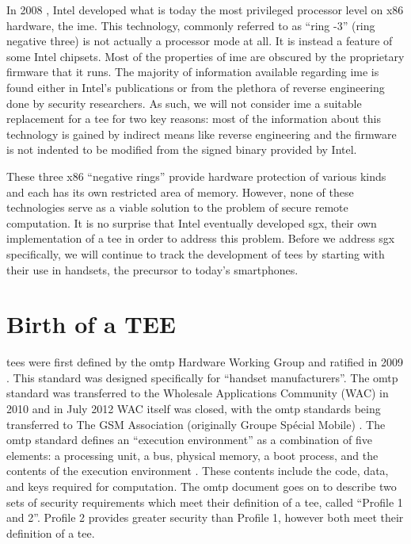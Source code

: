 In 2008 \cite{eldar2008configuring} , Intel developed what is today the most privileged processor level on x86 hardware, the \gls{ime}. This technology, commonly referred to as ``ring -3'' (ring negative three) is not actually a processor mode at all. It is instead a feature of some Intel chipsets. Most of the properties of \gls{ime} are obscured by the proprietary firmware that it runs. The majority of information available regarding \gls{ime} is found either in Intel's publications or from the plethora of reverse engineering done by security researchers. As such, we will not consider \gls{ime} a suitable replacement for a \gls{tee} for two key reasons: most of the information about this technology is gained by indirect means like reverse engineering and the firmware is not indented to be modified from the signed binary provided by Intel. 

These three x86 ``negative rings'' provide hardware protection of various kinds and each has its own restricted area of memory. However, none of these technologies serve as a viable solution to the problem of secure remote computation. It is no surprise that Intel eventually developed \gls{sgx}, their own implementation of a \gls{tee} in order to address this problem. Before we address \gls{sgx} specifically, we will continue to track the development of \glspl{tee} by starting with their use in handsets, the precursor to today's smartphones.

\section{Birth of a TEE}

\glspl{tee} were first defined by the \gls{omtp} Hardware Working Group and ratified in 2009 \cite{Confidential2009}. This standard was designed specifically for ``handset manufacturers''. The \gls{omtp} standard was transferred to the Wholesale Applications Community (WAC) in 2010 and in July 2012 WAC itself was closed, with the \gls{omtp} standards being transferred to The GSM Association (originally Groupe Sp\'ecial Mobile) \cite{WAC}. The \gls{omtp} standard defines an ``execution environment'' as a combination of five elements: a processing unit, a bus, physical memory, a boot process, and the contents of the execution environment \cite{Confidential2009}. These contents include the code, data, and keys required for computation. The \gls{omtp} document goes on to describe two sets of security requirements which meet their definition of a \gls{tee}, called ``Profile 1 and 2''. Profile 2 provides greater security than Profile 1, however both meet their definition of a \gls{tee}.

